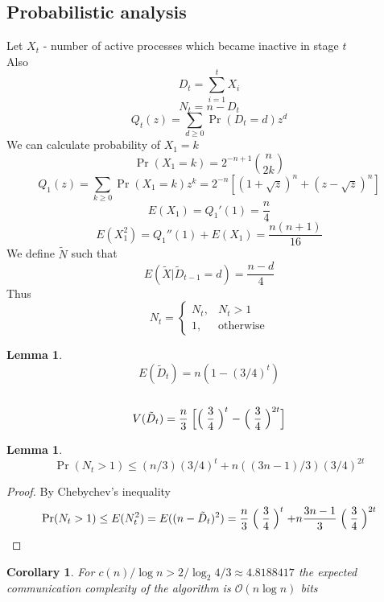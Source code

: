 \documentclass{article}
\newtheorem{corollary}{Corollary}[theorem]
\newtheorem{lemma}[theorem]{Lemma}
\begin{document}
\subsection{Probabilistic analysis}
Let $X_t$ - number of active processes which became inactive in stage $t$
\\Also $$D_t = \sum_{i=1}^t X_i$$ $$N_t = n-D_t$$ $$Q_t(z)=\sum_{d\geq 0} \Pr(D_t = d)z^d$$
We can calculate probability of $X_1 = k$
    $$\Pr(X_1 = k)=2^{-n+1}\binom{n}{2k}$$
    $$Q_1(z) = \sum_{k\geq 0} \Pr(X_1 = k) z^k = 2^{-n}[(1+\sqrt{z})^n + (z-\sqrt{z})^n]$$
    $$E(X_1) = Q_1'(1) = \frac{n}{4}$$
    $$E(X_1^2) = Q_1''(1) + E(X_1) = \frac{n(n+1)}{16}$$
We define $\tilde{N}$ such that $$E(\tilde{X} | \tilde{D}_{t-1}=d)=\frac{n-d}{4}$$
Thus $$N_t=
\begin{cases}
		    N_t, & {N_t > 1}\\
            1, & \text{otherwise}
\end{cases}$$
\begin{lemma}
$$E(\tilde{D}_t) = n(1-(3/4)^t)$$
\\$$V(\tilde{D}_t) = \frac{n}{3} \Bigm[\Bigm(\frac{3}{4}\Bigm)^t - \Bigm(\frac{3}{4}\Bigm)^{2t}\Bigm]$$
\end{lemma}

\begin{lemma}
$$\Pr(N_t > 1) \leq (n/3)(3/4)^t + n((3n-1)/3)(3/4)^{2t}$$
\end{lemma}
\begin{proof}

By Chebychev's inequality
$$\Pr(N_t > 1) \leq E(N_t^2) = E((n-\tilde{D}_t)^2) = \frac{n}{3}\Bigm(\frac{3}{4}\Bigm)^t + n \frac{3n-1}{3}\Bigm(\frac{3}{4}\Bigm)^{2t}$$
\end{proof}
\begin{corollary}
For $c(n)/\log n > 2/\log_2 {4/3} \approx 4.8188417 $ the expected communication complexity of the algorithm is $\mathcal{O}(n \log n)$ bits
\end{corollary}

\printbibliography
\end{document}
